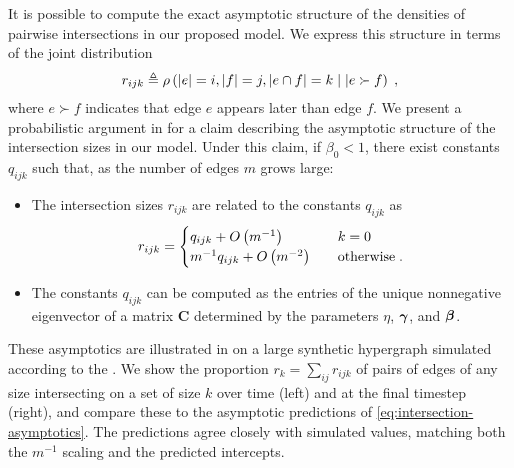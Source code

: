 It is possible to compute the exact asymptotic structure of the densities of pairwise intersections in our proposed model. 
We express this structure in terms of the joint distribution 
\begin{align}
    r_{ijk} \triangleq \rho \left(\left\lvert e \right\rvert = i, \left\lvert f \right\rvert = j, \left\lvert e\cap f \right\rvert = k \;\middle|\; | e\succ f\right)\;, 
\end{align}
where $e\succ f$ indicates that edge $e$ appears later than edge $f$.
We present a probabilistic argument in  for a claim describing the asymptotic structure of the intersection sizes in our model.
Under this claim, if $\beta_0 < 1$, there exist constants $q_{ijk}$ such that, as the number of edges $m$ grows large: 
\begin{itemize}
    \item The intersection sizes $r_{ijk}$ are related to the constants $q_{ijk}$ as 
    \begin{align}
        r_{ijk} = \begin{cases}
            q_{ijk} + O \left(m^{-1}\right) &\quad k = 0 \\
            m^{-1}q_{ijk} + O\left(m^{-2}\right) &\quad \text{otherwise\;.}
        \end{cases} \label{eq:intersection-asymptotics}
    \end{align}
    \item The constants $q_{ijk}$ can be computed as the entries of the unique nonnegative eigenvector of a matrix $\mathbf{C}$ determined by the parameters $\eta$, $\boldsymbol{\gamma}$, and $\boldsymbol{\beta}$. 
\end{itemize}
These asymptotics are illustrated in  on a large synthetic hypergraph simulated according to the \model{}. 
We show the proportion $r_{k} = \sum_{ij}r_{ijk}$ of pairs of edges of any size intersecting on a set of size $k$ over time (left) and at the final timestep (right), and compare these to the asymptotic predictions of \cref{eq:intersection-asymptotics}.
The predictions agree closely with simulated values, matching both the $m^{-1}$ scaling and the predicted intercepts. 

